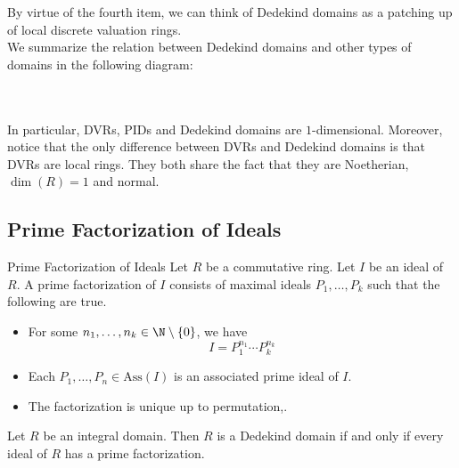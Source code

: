 \documentclass[a4paper]{article}
\begin{document}
By virtue of the fourth item, we can think of Dedekind domains as a patching up of local discrete valuation rings. \\

We summarize the relation between Dedekind domains and other types of domains in the following diagram: 

 \\~\\

In particular, DVRs, PIDs and Dedekind domains are $1$-dimensional. Moreover, notice that the only difference between DVRs and Dedekind domains is that DVRs are local rings. They both share the fact that they are Noetherian, $\dim(R)=1$ and normal. 

\subsection{Prime Factorization of Ideals}
\begin{defn}{Prime Factorization of Ideals}{} Let $R$ be a commutative ring. Let $I$ be an ideal of $R$. A prime factorization of $I$ consists of maximal ideals $P_1,\dots,P_k$ such that the following are true. 
\begin{itemize}
\item For some $n_1,\dots,n_k\in\N\setminus\{0\}$, we have $$I=P_1^{n_1}\cdots P_k^{n_k}$$
\item Each $P_1,\dots,P_n\in\text{Ass}(I)$ is an associated prime ideal of $I$. 
\item The factorization is unique up to permutation,. 
\end{itemize}
\end{defn}

\begin{prp}{}{} Let $R$ be an integral domain. Then $R$ is a Dedekind domain if and only if every ideal of $R$ has a prime factorization. 
\end{prp}
\end{document}
